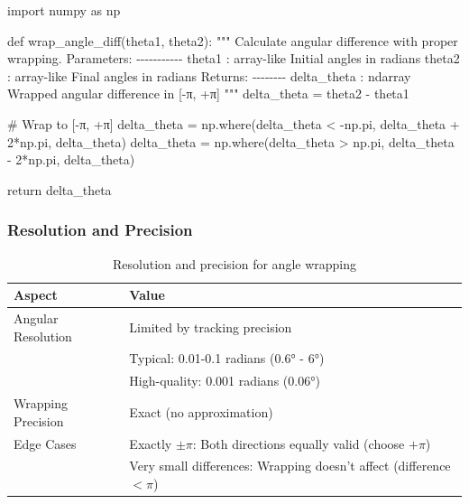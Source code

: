 \documentclass[
  11pt,
]{article}
\newenvironment{Shaded}{\begin{snugshade}}{\end{snugshade}}
\newcommand{\CommentTok}[1]{\textcolor[rgb]{0.37,0.37,0.37}{#1}}
\newcommand{\ControlFlowTok}[1]{\textcolor[rgb]{0.00,0.23,0.31}{#1}}
\newcommand{\DecValTok}[1]{\textcolor[rgb]{0.68,0.00,0.00}{#1}}
\newcommand{\ImportTok}[1]{\textcolor[rgb]{0.00,0.46,0.62}{#1}}
\newcommand{\KeywordTok}[1]{\textcolor[rgb]{0.00,0.23,0.31}{#1}}
\newcommand{\NormalTok}[1]{\textcolor[rgb]{0.00,0.23,0.31}{#1}}
\newcommand{\OperatorTok}[1]{\textcolor[rgb]{0.37,0.37,0.37}{#1}}
\begin{document}
\begin{Shaded}
\begin{Highlighting}[]
\ImportTok{import}\NormalTok{ numpy }\ImportTok{as}\NormalTok{ np}

\KeywordTok{def}\NormalTok{ wrap\_angle\_diff(theta1, theta2):}
    \CommentTok{"""}
\CommentTok{    Calculate angular difference with proper wrapping.}
\CommentTok{    }
\CommentTok{    Parameters:}
\CommentTok{    {-}{-}{-}{-}{-}{-}{-}{-}{-}{-}{-}}
\CommentTok{    theta1 : array{-}like}
\CommentTok{        Initial angles in radians}
\CommentTok{    theta2 : array{-}like}
\CommentTok{        Final angles in radians}
\CommentTok{    }
\CommentTok{    Returns:}
\CommentTok{    {-}{-}{-}{-}{-}{-}{-}{-}}
\CommentTok{    delta\_theta : ndarray}
\CommentTok{        Wrapped angular difference in [{-}π, +π]}
\CommentTok{    """}
\NormalTok{    delta\_theta }\OperatorTok{=}\NormalTok{ theta2 }\OperatorTok{{-}}\NormalTok{ theta1}
    
    \CommentTok{\# Wrap to [{-}π, +π]}
\NormalTok{    delta\_theta }\OperatorTok{=}\NormalTok{ np.where(delta\_theta }\OperatorTok{\textless{}} \OperatorTok{{-}}\NormalTok{np.pi, }
\NormalTok{                           delta\_theta }\OperatorTok{+} \DecValTok{2}\OperatorTok{*}\NormalTok{np.pi, }
\NormalTok{                           delta\_theta)}
\NormalTok{    delta\_theta }\OperatorTok{=}\NormalTok{ np.where(delta\_theta }\OperatorTok{\textgreater{}}\NormalTok{ np.pi, }
\NormalTok{                           delta\_theta }\OperatorTok{{-}} \DecValTok{2}\OperatorTok{*}\NormalTok{np.pi, }
\NormalTok{                           delta\_theta)}
    
    \ControlFlowTok{return}\NormalTok{ delta\_theta}
\end{Highlighting}
\end{Shaded}

\hypertarget{resolution-and-precision-2}{%
\subsubsection{Resolution and
Precision}\label{resolution-and-precision-2}}

\begin{table}[H]
\centering
\small
\begin{tabular}{p{5cm}p{9cm}}
\hline
\textbf{Aspect} & \textbf{Value} \\
\hline
Angular Resolution & Limited by tracking precision \\
 & Typical: 0.01-0.1 radians ($0.6°$ - $6°$) \\
 & High-quality: 0.001 radians ($0.06°$) \\
Wrapping Precision & Exact (no approximation) \\
Edge Cases & Exactly $\pm\pi$: Both directions equally valid (choose $+\pi$) \\
 & Very small differences: Wrapping doesn't affect (difference $< \pi$) \\
\hline
\end{tabular}
\caption{Resolution and precision for angle wrapping}

\end{table}
\end{document}
